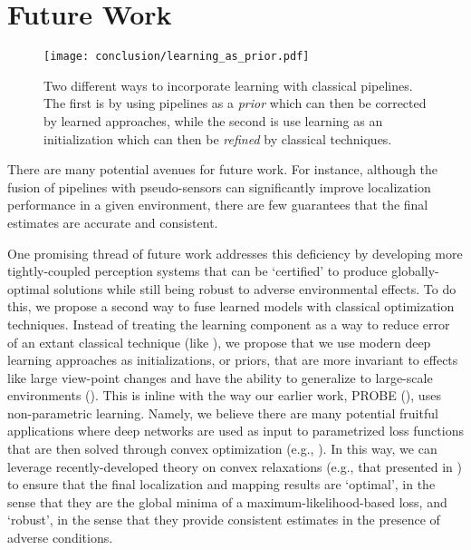 

\section{Future Work}

\begin{figure}
\begin{center}
		\texttt{[image: conclusion/learning\_as\_prior.pdf]}
		\caption{Two different ways to incorporate learning with classical pipelines. The first is by using pipelines as a \textit{prior} which can then be corrected by learned approaches, while the second is use learning as an initialization which can then be \textit{refined} by classical techniques.}
  	\label{fig:conc_learning_as_prior}
\end{center}
\end{figure}


There are many potential avenues for future work. For instance, although the fusion of pipelines with pseudo-sensors can significantly improve localization performance in a given environment, there are few guarantees that the final estimates are accurate and consistent.

One promising thread of future work addresses this deficiency by developing more tightly-coupled perception systems that can be ‘certified’ to produce globally-optimal solutions while still being robust to adverse environmental effects. To do this, we propose a second way to fuse learned models with classical optimization techniques. Instead of treating the learning component as a way to reduce error of an extant classical technique (like ), we propose that we use modern deep learning approaches as initializations, or priors, that are more invariant to effects like large view-point changes and have the ability to generalize to large-scale environments (). This is inline with the way our earlier work, PROBE (), uses non-parametric learning. Namely, we believe there are many potential fruitful applications where deep networks are used as input to parametrized loss functions that are then solved through convex optimization (e.g., \cite{amos2017optnet}). In this way, we can leverage recently-developed theory on convex relaxations (e.g., that presented in \cite{Rosen2019-kk}) to ensure that the final localization and mapping results are ‘optimal’, in the sense that they are the global minima of a maximum-likelihood-based loss, and ‘robust’, in the sense that they provide consistent estimates in the presence of adverse conditions. 

